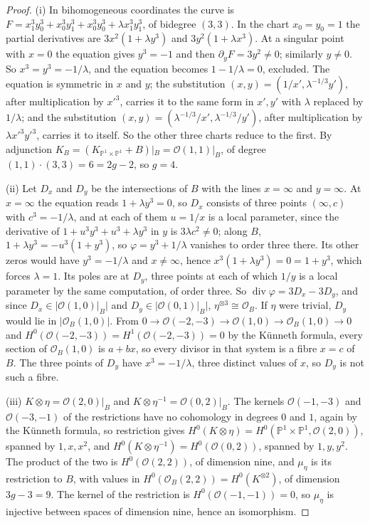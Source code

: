 \documentclass[11pt,reqno]{amsart}
\numberwithin{equation}{section}
\theoremstyle{plain}
\theoremstyle{definition}
\newcommand{\PP}{\mathbb{P}}
\begin{document}
\begin{proof}
(i) In bihomogeneous coordinates the curve is $F=x_{1}^{3}y_{0}^{3}+x_{0}^{3}y_{1}^{3}+x_{0}^{3}y_{0}^{3}+\lambda x_{1}^{3}y_{1}^{3}$, of bidegree $(3,3)$. In the chart $x_{0}=y_{0}=1$ the partial derivatives are $3x^{2}(1+\lambda y^{3})$ and $3y^{2}(1+\lambda x^{3})$. At a singular point with $x=0$ the equation gives $y^{3}=-1$ and then $\partial_{y}F=3y^{2}\ne0$; similarly $y\ne0$. So $x^{3}=y^{3}=-1/\lambda$, and the equation becomes $1-1/\lambda=0$, excluded. The equation is symmetric in $x$ and $y$; the substitution $(x,y)=(1/x',\lambda^{-1/3}y')$, after multiplication by $x'^{3}$, carries it to the same form in $x',y'$ with $\lambda$ replaced by $1/\lambda$; and the substitution $(x,y)=(\lambda^{-1/3}/x',\lambda^{-1/3}/y')$, after multiplication by $\lambda x'^{3}y'^{3}$, carries it to itself. So the other three charts reduce to the first. By adjunction $K_{B}=(K_{\PP^{1}\times\PP^{1}}+B)|_{B}=\mathcal{O}(1,1)|_{B}$, of degree $(1,1)\cdot(3,3)=6=2g-2$, so $g=4$.

(ii) Let $D_{x}$ and $D_{y}$ be the intersections of $B$ with the lines $x=\infty$ and $y=\infty$. At $x=\infty$ the equation reads $1+\lambda y^{3}=0$, so $D_{x}$ consists of three points $(\infty,c)$ with $c^{3}=-1/\lambda$, and at each of them $u=1/x$ is a local parameter, since the derivative of $1+u^{3}y^{3}+u^{3}+\lambda y^{3}$ in $y$ is $3\lambda c^{2}\ne0$; along $B$, $1+\lambda y^{3}=-u^{3}(1+y^{3})$, so $\varphi=y^{3}+1/\lambda$ vanishes to order three there. Its other zeros would have $y^{3}=-1/\lambda$ and $x\ne\infty$, hence $x^{3}(1+\lambda y^{3})=0=1+y^{3}$, which forces $\lambda=1$. Its poles are at $D_{y}$, three points at each of which $1/y$ is a local parameter by the same computation, of order three. So $\operatorname{div}\varphi=3D_{x}-3D_{y}$, and since $D_{x}\in|\mathcal{O}(1,0)|_{B}|$ and $D_{y}\in|\mathcal{O}(0,1)|_{B}|$, $\eta^{\otimes3}\cong\mathcal{O}_{B}$. If $\eta$ were trivial, $D_{y}$ would lie in $|\mathcal{O}_{B}(1,0)|$. From $0\to\mathcal{O}(-2,-3)\to\mathcal{O}(1,0)\to\mathcal{O}_{B}(1,0)\to0$ and $H^{0}(\mathcal{O}(-2,-3))=H^{1}(\mathcal{O}(-2,-3))=0$ by the K\"unneth formula, every section of $\mathcal{O}_{B}(1,0)$ is $a+bx$, so every divisor in that system is a fibre $x=c$ of $B$. The three points of $D_{y}$ have $x^{3}=-1/\lambda$, three distinct values of $x$, so $D_{y}$ is not such a fibre.

(iii) $K\otimes\eta=\mathcal{O}(2,0)|_{B}$ and $K\otimes\eta^{-1}=\mathcal{O}(0,2)|_{B}$. The kernels $\mathcal{O}(-1,-3)$ and $\mathcal{O}(-3,-1)$ of the restrictions have no cohomology in degrees $0$ and $1$, again by the K\"unneth formula, so restriction gives $H^{0}(K\otimes\eta)=H^{0}(\PP^{1}\times\PP^{1},\mathcal{O}(2,0))$, spanned by $1,x,x^{2}$, and $H^{0}(K\otimes\eta^{-1})=H^{0}(\mathcal{O}(0,2))$, spanned by $1,y,y^{2}$. The product of the two is $H^{0}(\mathcal{O}(2,2))$, of dimension nine, and $\mu_{\eta}$ is its restriction to $B$, with values in $H^{0}(\mathcal{O}_{B}(2,2))=H^{0}(K^{\otimes2})$, of dimension $3g-3=9$. The kernel of the restriction is $H^{0}(\mathcal{O}(-1,-1))=0$, so $\mu_{\eta}$ is injective between spaces of dimension nine, hence an isomorphism.


\end{proof}
\end{document}
